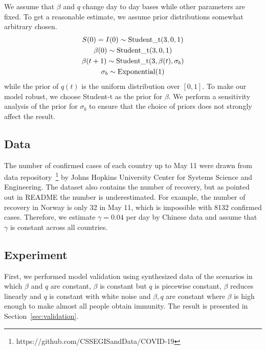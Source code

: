 \documentclass{amsart}
\begin{document}
We assume that $\beta$ and $q$ change day to day bases while other parameters are fixed.
To get a reasonable estimate, we assume prior distributions somewhat arbitrary chosen.
\begin{gather}
 S(0) = I(0) \sim \textup{Student\_t}(3, 0, 1)\\
 \beta(0) \sim \textup{Student\_t}(3, 0, 1)\\
 \beta(t+1) \sim \textup{Student\_t}(3, \beta(t), \sigma_b)\\
 \sigma_b \sim \textup{Exponential}(1)
\end{gather}
while the prior of $q(t)$ is the uniform distribution over $[0, 1]$.
To make our model robust, we choose Student-t as the prior for $\beta$.
We perform a sensitivity analysis of the prior for $\sigma_b$ to ensure that the choice of priors does not strongly affect the result.



\subsection{Data}

The number of confirmed cases of each country up to May 11 were drawn from data repository~\footnote{https://github.com/CSSEGISandData/COVID-19} by Johns Hopkins University Center for Systems Science and Engineering.
The dataset also contains the number of recovery, but as pointed out in README the number is underestimated.
For example, the number of recovery in Norway is only 32 in May 11, which is impossible with 8132 confirmed cases.
Therefore, we estimate $\gamma = 0.04$ per day by Chinese data and assume that $\gamma$ is constant across all countries.

\subsection{Experiment}

First, we performed model validation using synthesized data of the scenarios in which $\beta$ and $q$ are constant, $\beta$ is constant but $q$ is piecewise constant, $\beta$ reduces linearly and $q$ is constant with white noise and $\beta, q$ are constant where $\beta$ is high enough to make almost all people obtain immunity.
The result is presented in Section~\ref{sec:validation}.
\end{document}

